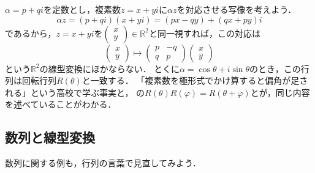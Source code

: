 \begin{mycolumn}
  $\alpha = p + qi$を定数とし，複素数$z = x + yi$に$\alpha z$を対応させる写像を考えよう．
  \[
    \alpha z = (p + qi)(x + yi) = (px - qy) + (qx + py)i
  \]
  であるから，$z = x + yi$を$\begin{pmatrix} x \\ y \end{pmatrix} \in \mathbb{R}^2$と同一視すれば，この対応は
  \[
    \begin{pmatrix} x \\ y \end{pmatrix} \longmapsto
    \begin{pmatrix} p & -q \\ q & p \end{pmatrix}
    \begin{pmatrix} x \\ y \end{pmatrix}
  \]
  という$\mathbb{R}^2$の線型変換にほかならない．
  とくに$\alpha = \cos\theta + i\sin\theta$のとき，この行列は回転行列$R(\theta)$と一致する．
  「複素数を極形式でかけ算すると偏角が足される」という高校で学ぶ事実と，
  の$R(\theta)R(\varphi) = R(\theta + \varphi)$とが，同じ内容を述べていることがわかる．
\end{mycolumn}

\subsection{数列と線型変換}

数列に関する例も，行列の言葉で見直してみよう．
\enlargethispage{2mm}


